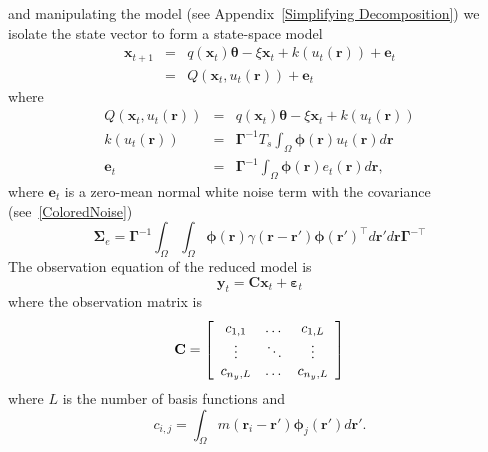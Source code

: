 \documentclass[12pt]{iopart}
\begin{document}
and manipulating the model (see Appendix~\ref{Simplifying Decomposition}) we isolate the state vector to form a state-space model 
\begin{eqnarray}
	\label{Homogeneous SS Model} \mathbf{x}_{t+1} &=& q(\mathbf{x}_t)\boldsymbol{\theta} - \xi\mathbf{x}_t + k\left(u_t\left(\mathbf{r}\right)\right) + \mathbf{e}_t \\
	&=& Q\left(\mathbf{x}_t,u_t(\mathbf{r})\right) + \mathbf{e}_t 
\end{eqnarray}
where
\begin{eqnarray}
Q\left(\mathbf{x}_t,u_t(\mathbf{r})\right)&=& q(\mathbf{x}_t)\boldsymbol{\theta} - \xi\mathbf{x}_t + k\left(u_t\left(\mathbf{r}\right)\right)\label{eq:QmatrixForSigmapoints}\\
	k(u_t(\mathbf{r})) &=& \boldsymbol{\Gamma}^{-1}T_s \int_\Omega{\boldsymbol{\phi} \left(\mathbf{r}\right) u_t\left(\mathbf{r}\right)d\mathbf{r}} \\
	\mathbf{e}_t &=& \label{eq:Reducednoiseterm} \boldsymbol{\Gamma}^{-1}\int_\Omega{\boldsymbol{\phi}(\mathbf{r})e_t(\mathbf{r})d\mathbf{r}}, 
\end{eqnarray}
where $\mathbf{e}_t$ is a zero-mean normal white noise term with the covariance (see~\ref{ColoredNoise}) 
\begin{equation}
	\boldsymbol{\Sigma}_e=\boldsymbol{\Gamma}^{-1}\int_{\Omega}\int_{\Omega}\boldsymbol{\phi}\left(\mathbf r\right) \gamma\left(\mathbf{r}- \mathbf{r}' \right)\boldsymbol{\phi}\left(\mathbf{r}'\right)^{\top}d\mathbf{r}' d\mathbf{r}\boldsymbol{\Gamma}^{- \top} 
\end{equation}
The observation equation of the reduced model is 
\begin{equation}
	\label{ObservationEquation} \mathbf{y}_t = \mathbf{C}\mathbf{x}_t + \boldsymbol{\varepsilon}_t 
\end{equation}
where the observation matrix is 
\begin{equation}
	\mathbf{C} = \left[
	\begin{array}{{ccc}} 
		c_{1,1} & \dots & c_{1,L} \\
		\vdots & \ddots & \vdots \\
		c_{n_y,L} & \dots & c_{n_y,L} 
	\end{array}
	\right] 
\end{equation}
where $L$ is the number of basis functions and 
\begin{equation}
	c_{i,j} = \int_{\Omega}m(\mathbf{r}_i - \mathbf{r}')\boldsymbol{\phi}_j(\mathbf{r}')d\mathbf{r}'. 
\end{equation}
\end{document}
